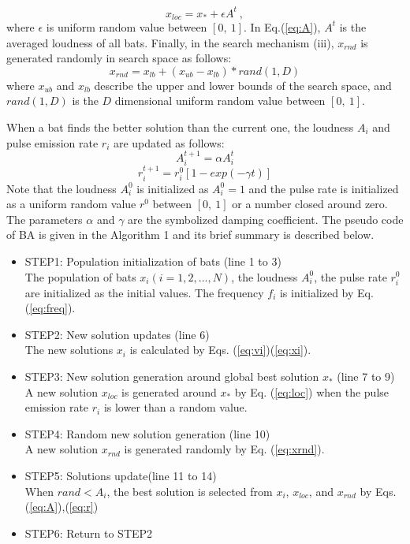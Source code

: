 \documentclass{ies2018}
\begin{document}
\begin{equation}
x_{loc}=x_{*}+ \epsilon A^t \ ,
\label{eq:loc}
\end{equation}
where ${\epsilon}$ is uniform random value between ${[0,  \ 1]}$. In Eq.(\ref{eq:A}), ${A^t}$ is the averaged loudness of all bats. Finally, in the search mechanism (iii), $x_{rnd}$ is generated randomly in search space as follows:
\begin{equation}
\label{eq:xrnd}
x_{rnd}=x_{lb}+(x_{ub}-x_{lb})*rand(1,D)
\end{equation}
where $x_{ub}$ and $x_{lb}$ describe the upper and lower bounds of the search space, and $rand(1,D)$ is the $D$ dimensional uniform random value between $[0, \ 1]$. 

When a bat finds the better solution than the current one, the loudness $A_i$ and pulse emission rate $r_i$ are updated as follows:
\begin{equation}
A_i^{t+1}=\alpha A_i^t
\label{eq:A}
\end{equation}
\begin{equation}
r_i^{t+1}=r_i^0[1-exp(-\gamma t)]
\label{eq:r}
\end{equation}
Note that the loudness $A_i^0$ is initialized as $A_i^0=1$ and the pulse rate is initialized as a uniform random value $r^0$ between $[0, \ 1]$ or a number closed around zero. The parameters $\alpha$ and $\gamma$ are the symbolized damping coefficient. The pseudo code of BA is given in the Algorithm 1 and its brief summary is described below.

\begin{itemize}
\item STEP1: Population initialization of bats (line 1 to 3)\\
The population of bats ${x_i}(i=1, 2, ..., N)$, the loudness ${A_i^0}$, the pulse rate ${r_i^0}$ are initialized as the initial values. The frequency ${f_i}$ is initialized by Eq.(\ref{eq:freq}).
\item STEP2: New solution updates (line 6)\\
The new solutions ${x_i}$ is calculated by Eqs. (\ref{eq:vi})(\ref{eq:xi}).
\item STEP3: New solution generation around global best solution ${x_*}$ (line 7 to 9)\\
A new solution $x_{loc}$ is generated around $x_*$ by Eq. (\ref{eq:loc}) when the pulse emission rate $r_i$ is lower than a random value.
\item STEP4: Random new solution generation (line 10)\\
A new solution ${x_{rnd}}$ is generated randomly by Eq. (\ref{eq:xrnd}).  
\item STEP5: Solutions update(line 11 to 14)\\
When ${rand < A_i}$, the best solution is selected from $x_i$, ${x_{loc}}$, and ${x_{rnd}}$ by Eqs.(\ref{eq:A}),(\ref{eq:r})
\item STEP6: Return to STEP2 
\end{itemize}
\end{document}

